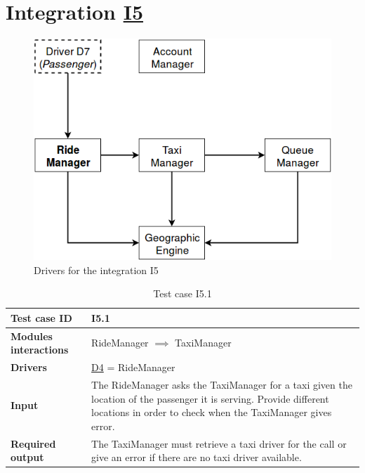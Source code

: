 \section{Integration \hyperref[I5]{I5} \label{int_I5}}
\begin{figure}[H]
\centering
\includegraphics[scale = 0.5]{"../Analysis Documents/I5"}
\caption{Drivers for the integration I5}
\end{figure}

\begin{table}[H]
\begin{tabular}{ l | p{} }
\textbf{Test case ID} & I5.1 \\ \hline
\textbf{Modules interactions} & RideManager $\implies$ TaxiManager \\ \hline
\textbf{Drivers} &  \hyperref[D4]{D4} = RideManager \\ \hline
\textbf{Input} & The RideManager asks the TaxiManager for a taxi given the location of the passenger it is serving. Provide different locations in order to check when the TaxiManager gives error. \\ \hline
\textbf{Required output} & The TaxiManager must retrieve a taxi driver for the call or give an error if there are no taxi driver available.
\end{tabular}
\caption{Test case I5.1}
\end{table}